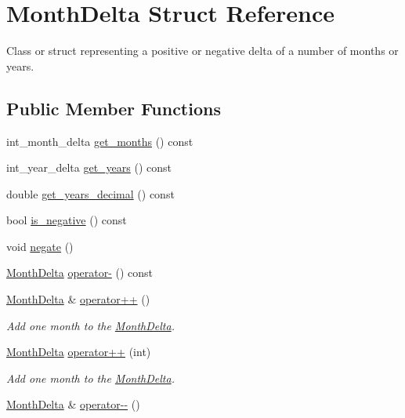 \hypertarget{structMonthDelta}{\section{\-Month\-Delta \-Struct \-Reference}
\label{structMonthDelta}
}


\-Class or struct representing a positive or negative delta of a number of months or years.  


\subsection*{\-Public \-Member \-Functions}
\begin{DoxyCompactItemize}
\item 
int\-\_\-month\-\_\-delta \hyperlink{structMonthDelta_a2359cd00364588c01724c71b223faeec}{get\-\_\-months} () const 
\item 
int\-\_\-year\-\_\-delta \hyperlink{structMonthDelta_a6e0788916adc59ac112d1f64cb42084d}{get\-\_\-years} () const 
\item 
double \hyperlink{structMonthDelta_abe185d4ea3e055f8eacab3077fbda465}{get\-\_\-years\-\_\-decimal} () const 
\item 
bool \hyperlink{structMonthDelta_a4f0b4051d92cd180ac5f9f7466a36f57}{is\-\_\-negative} () const 
\item 
void \hyperlink{structMonthDelta_a88f17c6793e3e48ac00a70e12b9045d3}{negate} ()
\item 
\hyperlink{structMonthDelta}{\-Month\-Delta} \hyperlink{structMonthDelta_a5d754349cccfb68c729461b7a96d666f}{operator-\/} () const 
\item 
\hyperlink{structMonthDelta}{\-Month\-Delta} \& \hyperlink{structMonthDelta_a2d925db7f08eb18d1dcd4961d8149b48}{operator++} ()
\begin{DoxyCompactList}\small\item\em \-Add one month to the \hyperlink{structMonthDelta}{\-Month\-Delta}. \end{DoxyCompactList}\item 
\hyperlink{structMonthDelta}{\-Month\-Delta} \hyperlink{structMonthDelta_afcbef7f90cde7cf06a312da4acd5a1b9}{operator++} (int)
\begin{DoxyCompactList}\small\item\em \-Add one month to the \hyperlink{structMonthDelta}{\-Month\-Delta}. \end{DoxyCompactList}\item 
\hyperlink{structMonthDelta}{\-Month\-Delta} \& \hyperlink{structMonthDelta_a792c4dd313efad2aec9dc80b7d18dc4e}{operator-\/-\/} ()

\end{DoxyCompactItemize}
